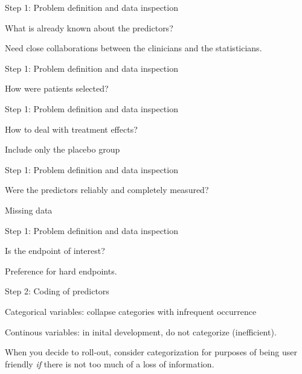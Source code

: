 \documentclass[
  12pt,
  ignorenonframetext,
]{beamer}
\begin{document}
\begin{frame}{Step 1: Problem definition and data inspection}
\protect\hypertarget{step-1-problem-definition-and-data-inspection-1}{}

What is already known about the predictors?

Need close collaborations between the clinicians and the statisticians.

\end{frame}

\begin{frame}{Step 1: Problem definition and data inspection}
\protect\hypertarget{step-1-problem-definition-and-data-inspection-2}{}

How were patients selected?

\end{frame}

\begin{frame}{Step 1: Problem definition and data inspection}
\protect\hypertarget{step-1-problem-definition-and-data-inspection-3}{}

How to deal with treatment effects?

Include only the placebo group

\end{frame}

\begin{frame}{Step 1: Problem definition and data inspection}
\protect\hypertarget{step-1-problem-definition-and-data-inspection-4}{}

Were the predictors reliably and completely measured?

Missing data

\end{frame}

\begin{frame}{Step 1: Problem definition and data inspection}
\protect\hypertarget{step-1-problem-definition-and-data-inspection-5}{}

Is the endpoint of interest?

Preference for hard endpoints.

\end{frame}

\begin{frame}{Step 2: Coding of predictors}
\protect\hypertarget{step-2-coding-of-predictors}{}

Categorical variables: collapse categories with infrequent occurrence

Continous variables: in inital development, do not categorize
(inefficient).

When you decide to roll-out, consider categorization for purposes of
being user friendly \emph{if} there is not too much of a loss of
information.

\end{frame}
\end{document}
